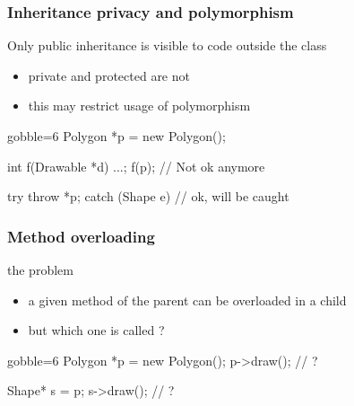 \begin{frame}[fragile]
  \frametitle{Inheritance privacy and polymorphism}
  \begin{block}{Only public inheritance is visible to code outside the class}
    \begin{itemize}
    \item private and protected are not
    \item this may restrict usage of polymorphism
    \end{itemize}
  \end{block}
  \begin{multicols}{2}
    \begin{cppcode*}{gobble=6}
      Polygon *p = new Polygon();

      int f(Drawable *d) {...};
      f(p);  // Not ok anymore

      try {
        throw *p;
      } catch (Shape e) {
        // ok, will be caught
      }
    \end{cppcode*}
    \columnbreak
    \center
  \end{multicols}
\end{frame}

\begin{frame}[fragile]
  \frametitle{Method overloading}
  \begin{block}{the problem}
    \begin{itemize}
    \item a given method of the parent can be overloaded in a child
    \item but which one is called ?
    \end{itemize}
  \end{block}
  \begin{multicols}{2}
    \begin{cppcode*}{gobble=6}
      Polygon *p = new Polygon();
      p->draw(); // ?
      
      Shape* s = p;
      s->draw(); // ?
    \end{cppcode*}
    \columnbreak
    \center
  \end{multicols}
\end{frame}


